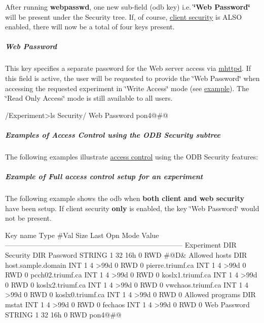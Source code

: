 After running {\bfseries webpasswd}, one new sub-\/field (odb key) i.e. {\bfseries \char`\"{}Web Password\char`\"{}} will be present under the Security tree. If, of course, \hyperlink{RC_customize_ODB_RC_Setup_Security}{client security} is ALSO enabled, there will now be a total of four keys present.\hypertarget{RC_customize_ODB_RC_security_web_pw}{}\subparagraph{Web Password}\label{RC_customize_ODB_RC_security_web_pw}
This key specifies a separate password for the Web server access via \hyperlink{RC_mhttpd_utility}{mhttpd}. If this field is active, the user will be requested to provide the \char`\"{}Web Password\char`\"{} when accessing the requested experiment in \char`\"{}Write Access\char`\"{} mode (see \hyperlink{RC_mhttpd_ODB_page}{example}). The \char`\"{}Read Only Access\char`\"{} mode is still available to all users. 
\begin{DoxyCode}
/Experiment>ls Security/
Web Password                    pon4@#@%
\end{DoxyCode}




\hypertarget{RC_customize_ODB_RC_Example_security}{}\subparagraph{Examples of Access Control using the ODB Security subtree}\label{RC_customize_ODB_RC_Example_security}
The following examples illustrate \hyperlink{RC_customize_ODB_RC_Access_Control}{access control} using the ODB Security features:\hypertarget{RC_customize_ODB_RC_Example_full_security}{}\subparagraph{Example of Full access control  setup for an experiment}\label{RC_customize_ODB_RC_Example_full_security}
The following example shows the odb when {\bfseries both client and web security} have been setup. If client security {\bfseries only} is enabled, the key \char`\"{}Web Password\char`\"{} would not be present.


\begin{DoxyCode}
Key name                        Type    #Val  Size  Last Opn Mode Value
---------------------------------------------------------------------------
Experiment                      DIR
    Security                    DIR
        Password                STRING  1     32    16h  0   RWD  #@D&%
        Allowed hosts           DIR
            host.sample.domain  INT     1     4     >99d 0   RWD  0
            pierre.triumf.ca    INT     1     4     >99d 0   RWD  0
            pcch02.triumf.ca    INT     1     4     >99d 0   RWD  0
            koslx1.triumf.ca    INT     1     4     >99d 0   RWD  0
            koslx2.triumf.ca    INT     1     4     >99d 0   RWD  0
            vwchaos.triumf.ca   INT     1     4     >99d 0   RWD  0
            koslx0.triumf.ca    INT     1     4     >99d 0   RWD  0
        Allowed programs        DIR
            mstat               INT     1     4     >99d 0   RWD  0
            fechaos             INT     1     4     >99d 0   RWD  0
        Web Password            STRING  1     32    16h  0   RWD  pon4@#@%
\end{DoxyCode}


